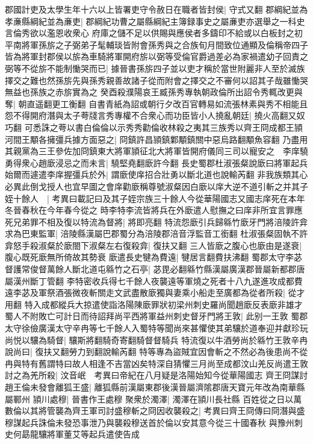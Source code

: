 郡國計吏及太學生年十六以上皆署吏守令赦日在職者皆封侯|{
	守式又翻}
郡綱紀並為孝亷縣綱紀並為亷吏|{
	郡綱紀功曹之屬縣綱紀主簿録事史之屬亷吏亦選舉之一科史言倫秀欲以濫恩收衆心}
府庫之儲不足以供賜與應侯者多鑄印不給或以白板封之初平南將軍孫旂之子弼弟子髦輔琰皆附會孫秀與之合族旬月間致位通顯及倫稱帝四子皆為將軍封郡侯以旂為車騎將軍開府旂以弼等受倫官爵過差必為家禍遣幼子回責之弼等不從旂不能制慟哭而已|{
	據晉書孫旂四子並以吏才稱於當世附麗非人至於滅族擇交之難也然孫旂先與孫秀親善故諸子從而附會之擇交之不審何以詔其子哉雖慟哭無益也孫族之赤旂實為之}
癸酉殺濮陽哀王臧孫秀專執朝政倫所出詔令秀輒改更與奪|{
	朝直遥翻更工衡翻}
自書青紙為詔或朝行夕改百官轉易如流張林素與秀不相能且怨不得開府潛與太子荂牋言秀專權不合衆心而功臣皆小人撓亂朝廷|{
	撓火高翻又奴巧翻}
可悉誅之荂以書白倫倫以示秀秀勸倫收林殺之夷其三族秀以齊王冏成都王頴河間王顒各擁彊兵據方面惡之|{
	冏鎮許昌頴鎮鄴顒鎮關中惡烏路翻顒魚容翻}
乃盡用其親黨為三王參佐加冏鎮東大將軍頴征北大將軍皆開府儀同三司以寵安之　李庠驍勇得衆心趙廞浸忌之而未言|{
	驍堅堯翻廞許今翻}
長史蜀郡杜淑張粲說廞曰將軍起兵始爾而遽遣李庠握彊兵於外|{
	謂廞使庠招合壯勇以斷北道也說輸芮翻}
非我族類其心必異此倒戈授人也宜早圖之會庠勸廞稱尊號淑粲因白廞以庠大逆不道引斬之并其子姪十餘人　|{
	考異曰載記曰及其子姪宗族三十餘人今從華陽國志又國志庠死在本年冬晉春秋在今年春今從之}
時李特李流皆將兵在外廞遣人慰撫之曰庠非所宜言罪應死兄弟罪不相及復以特流為督將|{
	將即亮翻}
特流怨廞引兵歸緜竹廞牙門將涪陵許弇求為巴東監軍|{
	涪陵縣漢屬巴郡蜀分為涪陵郡涪音浮監音工銜翻}
杜淑張粲固執不許弇怒手殺淑粲於廞閤下淑粲左右復殺弇|{
	復扶又翻}
三人皆廞之腹心也廞由是遂衰|{
	腹心既死廞無所倚故其勢衰}
廞遣長史犍為費遠|{
	犍居言翻費扶沸翻}
蜀郡太守李苾督護常俊督萬餘人斷北道屯緜竹之石亭|{
	苾毘必翻緜竹縣漢屬廣漢郡晉屬新都郡唐屬漢州斷丁管翻}
李特密收兵得七千餘人夜襲遠等軍燒之死者十八九遂進攻成都費遠李苾及軍祭酒張微夜斬關走文武盡散廞獨與妻乘小船走至廣都為從者所殺|{
	從才用翻}
特入成都縱兵大掠遣使詣洛陽陳廞罪狀初梁州刺史羅尚聞趙廞反表廞非雄才蜀人不附敗亡可計日而待詔拜尚平西將軍益州刺史督牙門將王敦|{
	此别一王敦}
蜀郡太守徐儉廣漢太守辛冉等七千餘人入蜀特等聞尚來甚懼使其弟驤於道奉迎并獻珍玩尚悦以驤為騎督|{
	驤斯將翻騎奇寄翻騎督督騎兵}
特流復以牛酒勞尚於緜竹王敦辛冉說尚曰|{
	復扶又翻勞力到翻說輸芮翻}
特等專為盜賊宜因會斬之不然必為後患尚不從冉與特有舊謂特曰故人相逢不吉當凶矣特深自猜懼三月尚至成都汶山羌反尚遣王敦討之為羌所殺|{
	汶音岷　考異曰帝紀在八月疑是洛陽始知今從華陽國志}
齊王冏謀討趙王倫未發會離狐王盛|{
	離狐縣前漢屬東郡後漢晉屬濟隂郡唐天寶元年改為南華縣屬鄆州}
頴川處穆|{
	晉書作王處穆}
聚衆於濁澤|{
	濁澤在頴川長社縣}
百姓從之日以萬數倫以其將管襲為齊王軍司討盛穆斬之冏因收襲殺之|{
	考異曰齊王冏傳曰冏潛與盛穆謀起兵誅倫未發恐事泄乃與襲殺穆送首於倫以安其意今從三十國春秋}
與豫州刺史何勗龍驤將軍董艾等起兵遣使告成

